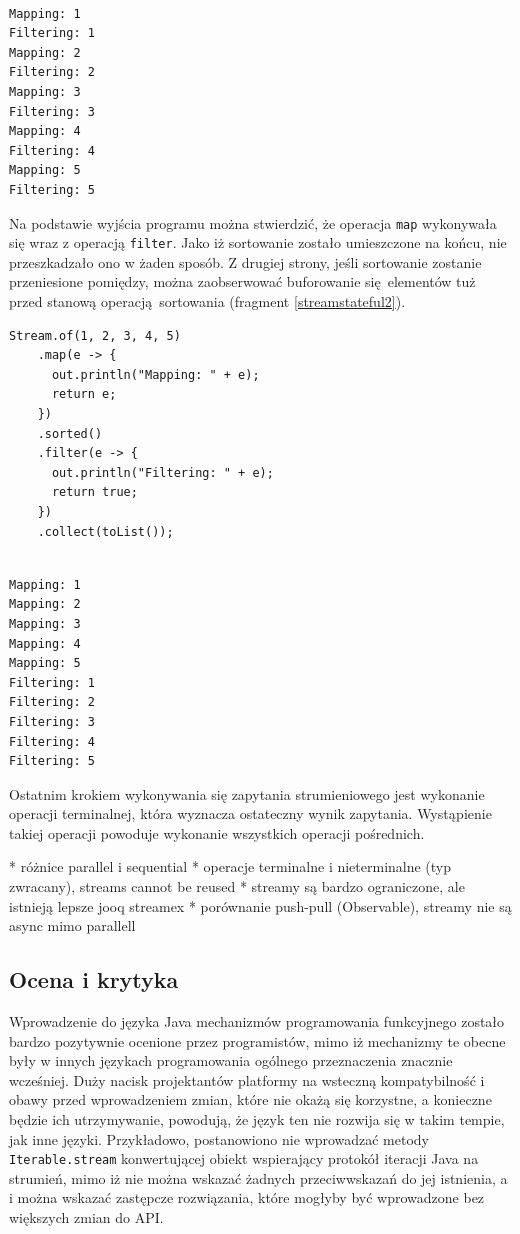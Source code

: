 \documentclass[12pt]{extarticle}
\begin{document}
\begin{verbatim}

Mapping: 1
Filtering: 1
Mapping: 2
Filtering: 2
Mapping: 3
Filtering: 3
Mapping: 4
Filtering: 4
Mapping: 5
Filtering: 5

\end{verbatim}

    Na podstawie wyjścia programu można stwierdzić, że operacja \texttt{map} wykonywała się wraz z operacją \texttt{filter}. Jako iż sortowanie zostało umieszczone na końcu, nie przeszkadzało ono w żaden sposób. Z drugiej strony, jeśli sortowanie zostanie przeniesione pomiędzy, można zaobserwować buforowanie się elementów tuż przed stanową operacją sortowania (fragment \ref{streamstateful2}).

\begin{lstlisting}[label=streamstateful2, caption=Brak fuzji operacji stanowych]
Stream.of(1, 2, 3, 4, 5)
    .map(e -> {
      out.println("Mapping: " + e);
      return e;
    })
    .sorted()
    .filter(e -> {
      out.println("Filtering: " + e);
      return true;
    })
    .collect(toList());
\end{lstlisting}

\begin{verbatim}

Mapping: 1
Mapping: 2
Mapping: 3
Mapping: 4
Mapping: 5
Filtering: 1
Filtering: 2
Filtering: 3
Filtering: 4
Filtering: 5

\end{verbatim}

    Ostatnim krokiem wykonywania się zapytania strumieniowego jest wykonanie operacji terminalnej, która wyznacza ostateczny wynik zapytania. Wystąpienie takiej operacji powoduje wykonanie wszystkich operacji pośrednich. 

* różnice parallel i sequential
* operacje terminalne i nieterminalne (typ zwracany), streams cannot be reused
* streamy są bardzo ograniczone, ale istnieją lepsze jooq streamex
* porównanie push-pull (Observable), streamy nie są async mimo parallell

\subsection{Ocena i krytyka}

    Wprowadzenie do języka Java mechanizmów programowania funkcyjnego zostało bardzo pozytywnie ocenione przez programistów, mimo iż mechanizmy te obecne były w innych językach programowania ogólnego przeznaczenia znacznie wcześniej. Duży nacisk projektantów platformy na wsteczną kompatybilność i obawy przed wprowadzeniem zmian, które nie okażą się korzystne, a konieczne będzie ich utrzymywanie, powodują, że język ten nie rozwija się w takim tempie, jak inne języki. Przykładowo, postanowiono nie wprowadzać metody \texttt{Iterable.stream} konwertującej obiekt wspierający protokół iteracji Java na strumień, mimo iż nie można wskazać żadnych przeciwwskazań do jej istnienia, a i można wskazać zastępcze rozwiązania, które mogłyby być wprowadzone bez większych zmian do API.
\end{document}
